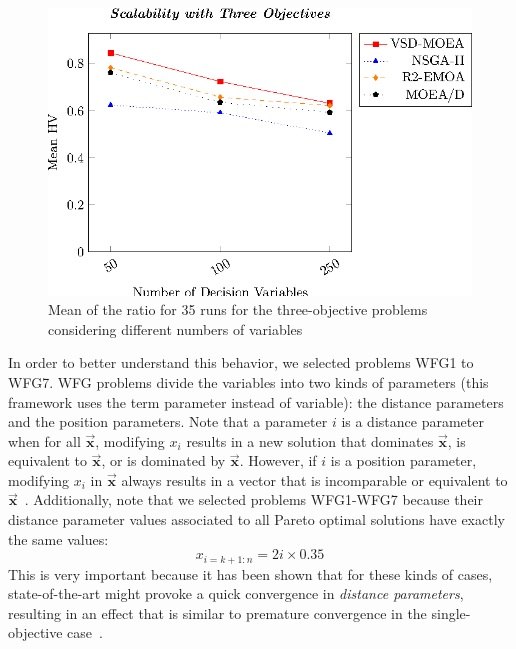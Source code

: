 \begin{figure}[t]
\centering
\includegraphics[scale=0.85]{Images/Graphic-Scalability-3obj_tikz-figure0.eps}
\caption{Mean of the \HV{} ratio for 35 runs for the three-objective problems considering different numbers of variables} \label{fig:variable-decision-scalability-3obj}
\end{figure}

In order to better understand this behavior, we selected problems WFG1 to WFG7.
%
WFG problems divide the variables into two kinds of parameters (this framework uses the term parameter instead of variable): the distance parameters and the position parameters.
%
Note that a parameter $i$ is a distance parameter when for all $\vec{\mathbf{x}}$, modifying $x_i$ results in a new solution 
that dominates $\vec{\mathbf{x}}$, is equivalent to $\vec{\mathbf{x}}$, or is dominated by $\vec{\mathbf{x}}$.
%
However, if $i$ is a position parameter, modifying $x_i$ in $\vec{\mathbf{x}}$ always results in a vector that is incomparable or 
equivalent to $\vec{\mathbf{x}}$~\cite{huband2005scalable}.
%
Additionally, note that we selected problems WFG1-WFG7 because their distance parameter values associated to all Pareto optimal solutions 
have exactly the same values:
%
\begin{equation}
   x_{i=k+1:n} = 2i \times 0.35
\end{equation}
%
This is very important because it has been shown that for these kinds of cases, state-of-the-art
\MOEAS{} might provoke a quick convergence in \textit{distance parameters}, resulting in an effect that is similar to premature convergence
in the single-objective case~\cite{Joel:GDE3_CEC09}.

